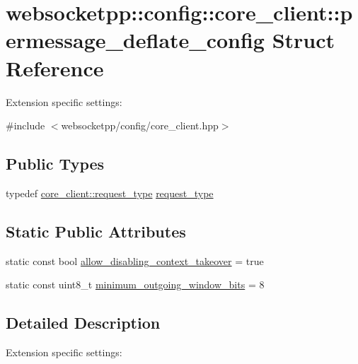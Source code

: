 \hypertarget{structwebsocketpp_1_1config_1_1core__client_1_1permessage__deflate__config}{}\section{websocketpp\+:\+:config\+:\+:core\+\_\+client\+:\+:permessage\+\_\+deflate\+\_\+config Struct Reference}
\label{structwebsocketpp_1_1config_1_1core__client_1_1permessage__deflate__config}


Extension specific settings\+:  




{\ttfamily \#include $<$websocketpp/config/core\+\_\+client.\+hpp$>$}

\subsection*{Public Types}
\begin{DoxyCompactItemize}
\item 
typedef \hyperlink{structwebsocketpp_1_1config_1_1core__client_a1fd74b16e3add246b1c356f6f14f206b}{core\+\_\+client\+::request\+\_\+type} \hyperlink{structwebsocketpp_1_1config_1_1core__client_1_1permessage__deflate__config_ad232507a23e7a2c6c70ae631dc87b80d}{request\+\_\+type}
\end{DoxyCompactItemize}
\subsection*{Static Public Attributes}
\begin{DoxyCompactItemize}
\item 
static const bool \hyperlink{structwebsocketpp_1_1config_1_1core__client_1_1permessage__deflate__config_ab7cbd54d076521a3edf75bb44144d676}{allow\+\_\+disabling\+\_\+context\+\_\+takeover} = true
\item 
static const uint8\+\_\+t \hyperlink{structwebsocketpp_1_1config_1_1core__client_1_1permessage__deflate__config_a0ac8d0ba3a5fcc0220cd282b2e18242c}{minimum\+\_\+outgoing\+\_\+window\+\_\+bits} = 8
\end{DoxyCompactItemize}


\subsection{Detailed Description}
Extension specific settings\+: 

